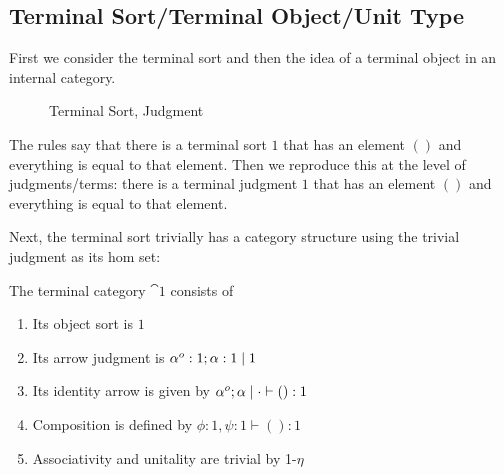 \documentclass{article}
\begin{document}
\subsection{Terminal Sort/Terminal Object/Unit Type}

First we consider the terminal sort and then the idea of a terminal
object in an internal category.

\begin{figure}
  \caption{Terminal Sort, Judgment}
\end{figure}

The rules say that there is a terminal sort $1$ that has an element
$()$ and everything is equal to that element.
Then we reproduce this at the level of judgments/terms: there is a
terminal judgment $1$ that has an element $()$ and everything is equal
to that element.

Next, the terminal sort trivially has a category structure using the
trivial judgment as its hom set:

\begin{definition}
  The terminal category $\cat 1$ consists of
  \begin{enumerate}
  \item Its object sort is $1$
  \item Its arrow judgment is $\alpha^o:1;\alpha:1 \mathrel{|} 1$
  \item Its identity arrow is given by $\alpha^o;\alpha \mathrel{|} \cdot \vdash () : 1$
  \item Composition is defined by $\phi : 1, \psi : 1 \vdash () : 1$
  \item Associativity and unitality are trivial by \textsc{1-$\eta$}
  \end{enumerate}
\end{definition}
\end{document}
